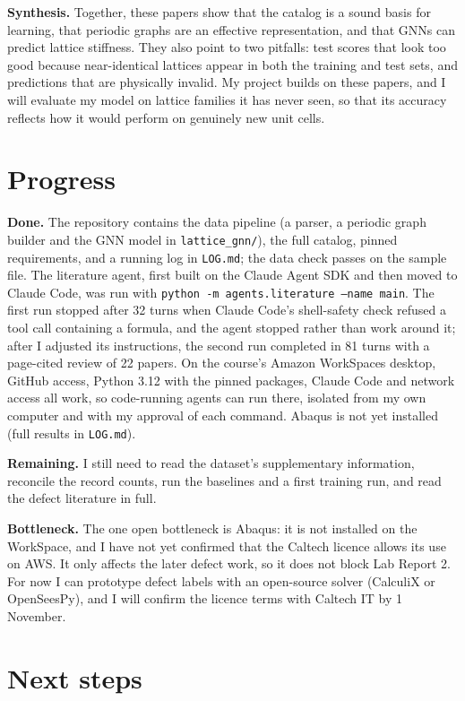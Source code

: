 \documentclass[11pt]{article}
\begin{document}
\textbf{Synthesis.} Together, these papers show that the catalog is a sound basis for learning,
that periodic graphs are an effective representation, and that GNNs can predict lattice stiffness.
They also point to two pitfalls: test scores that look too good because near-identical lattices
appear in both the training and test sets, and predictions that are physically invalid. My project
builds on these papers, and I will evaluate my model on lattice families it has never seen, so that
its accuracy reflects how it would perform on genuinely new unit cells.

\section{Progress}\label{sec:progress}

\textbf{Done.} The repository contains the data pipeline (a parser, a periodic graph builder and
the GNN model in \texttt{lattice\_gnn/}), the full catalog, pinned requirements, and a running log
in \texttt{LOG.md}; the data check passes on the sample file. The literature agent, first built on
the Claude Agent SDK and then moved to Claude Code, was run with
\texttt{python -m agents.literature --name main}. The first run stopped after 32 turns when Claude
Code's shell-safety check refused a tool call containing a formula, and the agent stopped rather
than work around it; after I adjusted its instructions, the second run completed in 81 turns with a
page-cited review of 22 papers. On the course's Amazon WorkSpaces desktop, GitHub access, Python
3.12 with the pinned packages, Claude Code and network access all work, so code-running agents can
run there, isolated from my own computer and with my approval of each command. Abaqus is not yet
installed (full results in \texttt{LOG.md}).

\textbf{Remaining.} I still need to read the dataset's supplementary information, reconcile the
record counts, run the baselines and a first training run, and read the defect literature in full.

\textbf{Bottleneck.} The one open bottleneck is Abaqus: it is not installed on the WorkSpace, and I
have not yet confirmed that the Caltech licence allows its use on AWS. It only affects the later
defect work, so it does not block Lab Report 2. For now I can prototype defect labels with an
open-source solver (CalculiX or OpenSeesPy), and I will confirm the licence terms with Caltech IT
by 1 November.

\section{Next steps}
\end{document}
